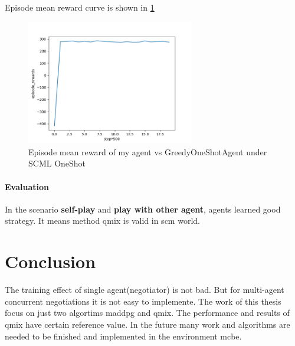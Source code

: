 Episode mean reward curve is shown in \ref{fig:oneshot-my-vs-greedy}

\begin{figure}[htbp]
\centering
\includegraphics[width=0.65\textwidth]{./images/oneshot_my_vs_greedy.png}
\caption{Episode mean reward of my agent vs GreedyOneShotAgent under SCML OneShot}
\label{fig:oneshot-my-vs-greedy}
\end{figure}

\paragraph{Evaluation} In the scenario \textbf{self-play} and \textbf{play with other agent}, agents learned good strategy. It means method \gls{qmix} is valid in \gls{scm} world.


\section{Conclusion}
The training effect of single agent(negotiator) is not bad. But for multi-agent concurrent negotiations it is not easy to implemente. The work of this thesis focus on just two algortims \gls{maddpg} and \gls{qmix}. The performance and results of \gls{qmix} have certain reference value. In the future many work and algorithms are needed to be finished and implemented in the environment \gls{mcbe}.